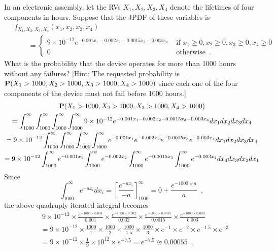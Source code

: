 \begin{ExerciseList}
\Exercise
In an electronic assembly, let the RVs $X_1,X_2,X_3,X_4$ denote the lifetimes of four components in hours.  
Suppose that the JPDF of these variables is
\begin{align*}
~& f_{X_1,X_2,X_3,X_4}(x_1,x_2,x_3,x_4) \\
&\qquad= 
\begin{cases}
9 \times 10^{-12} e^{-0.001 x_1 - 0.002 x_2 - 0.0015 x_3 - 0.003 x_4} & \text{ if } x_1 \geq 0, x_2 \geq 0, x_3 \geq 0, x_4 \geq 0\\
0 & \text{ otherwise} \enspace.
\end{cases}
\end{align*}
What is the probability that the device operates for more than 1000 hours without any failures? [Hint: The requested probability is $\mathbf{P}(X_1>1000,X_2>1000,X_3>1000,X_4>1000)$ since each one of the four components of the device must not fail before 1000 hours.]
\Answer
~\\
\begin{multline*}
\mathbf{P}(X_1>1000,X_2>1000,X_3>1000,X_4>1000) \\
= \int_{1000}^{\infty} \int_{1000}^{\infty} \int_{1000}^{\infty} \int_{1000}^{\infty} 9 \times 10^{-12} e^{-0.001 x_1 - 0.002 x_2 - 0.0015 x_3 - 0.003 x_4} dx_1 dx_2 dx_3 dx_4\\
= 9 \times 10^{-12} \int_{1000}^{\infty} \int_{1000}^{\infty} \int_{1000}^{\infty} \int_{1000}^{\infty}  e^{-0.001 x_1} e^{- 0.002 x_2} e^{- 0.0015 x_3} e^{- 0.003 x_4} dx_1 dx_2 dx_3 dx_4\\
=  9 \times 10^{-12} \int_{1000}^{\infty} e^{-0.001 x_1} \int_{1000}^{\infty} e^{- 0.002 x_2} \int_{1000}^{\infty} e^{- 0.0015 x_3} \int_{1000}^{\infty} e^{- 0.003 x_4} dx_4 dx_3 dx_2 dx_1\\
\end{multline*}
Since
\[
\int_{1000}^{\infty} e^{- a x_i} dx_i = \left[ \frac{e^{-a x_i}}{-a} \right]_{1000}^{\infty} = 0 + \frac{e^{-1000\times a}}{a} \enspace ,
\]
the above quadruply iterated integral becomes
\begin{align*}
&~ 9 \times 10^{-12} \times \frac{e^{-1000 \times 0.001}}{0.001} \times \frac{e^{-1000 \times 0.002}}{0.002} 
\times \frac{e^{-1000 \times 0.0015}}{0.0015} \times \frac{e^{-1000 \times 0.003}}{0.003}\\
&= 9 \times 10^{-12} \times \frac{1000}{1} \times \frac{1000}{2} \times \frac{1000}{1.5} \times \frac{1000}{3} \times
e^{-1} \times e^{-2} \times e^{-1.5} \times e^{-3} \\
&= 9 \times 10^{-12} \times \frac{1}{9} \times 10^{12} \times e^{-7.5} = e^{-7.5} \approxeq 0.00055 \enspace .
\end{align*}


\end{ExerciseList}
